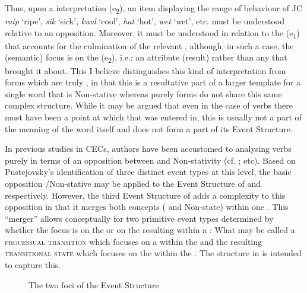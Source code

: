 Thus, upon a  interpretation (e\textsubscript{2}), an item displaying the range of behaviour of JC \textit{raip} `ripe’, \textit{sik} `sick’, \textit{kuul} `cool’, \textit{hat} `hot’, \textit{wet} `wet’, etc. must be understood relative to an opposition. Moreover, it must be understood in relation to the  (e\textsubscript{1}) that accounts for the culmination of the relevant , although, in such a case, the (semantic) focus is on the  (e\textsubscript{2}), i.e.: an attribute (result) rather than any  that brought it about. This I believe distinguishes this kind of  interpretation from forms which are truly , in that this  is a resultative part of a larger template for a single word that is Non-stative whereas purely  forms do not share this same complex structure. While it may be argued that even in the case of  verbs there must have been a point at which that  was entered in, this is usually not a part of the meaning of the word itself and does not form a part of its Event Structure.

In previous studies in CECs, authors have been accustomed to analysing verbs purely in terms of an opposition between  and Non-stativity (cf. \citealt{Bickerton1975,Jaganauth1987,Winford1993,Gooden2008}; etc). Based on Pustejovsky’s identification of three distinct event types at this level, the basic opposition \slash Non-stative may be applied to the Event Structure of  and  respectively. However, the third Event Structure of  adds a complexity to this opposition in that it merges both concepts ( and Non-state) within one . This ``merger'' allows conceptually for two primitive event types determined by whether the focus is on the  or on the resulting  within a : What may be called a \textsc{processual transition} which focuses on a  within the  and the resulting \textsc{transitional state} which focuses on the  within the . The structure in  is intended to capture this.

 
 \begin{figure}
 \caption{The two foci of the  Event Structure \label{ex:5:13}}
\end{figure}

